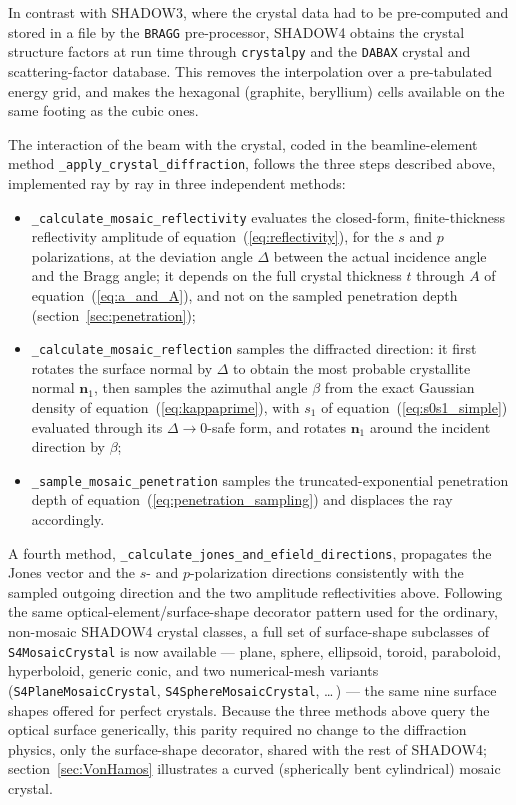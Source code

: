 \documentclass{iucr}
\begin{document}
In contrast with SHADOW3, where the crystal data had to be pre-computed and stored
in a file by the \texttt{BRAGG} pre-processor, SHADOW4 obtains the crystal
structure factors at run time through \texttt{crystalpy} and the \texttt{DABAX}
crystal and scattering-factor database. This removes the interpolation over a
pre-tabulated energy grid, and makes the hexagonal (graphite, beryllium) cells
available on the same footing as the cubic ones.

The interaction of the beam with the crystal, coded in the beamline-element
method \texttt{\_apply\_crystal\_diffraction}, follows the three steps described
above, implemented ray by ray in three independent methods:
\begin{itemize}
\item \texttt{\_calculate\_mosaic\_reflectivity} evaluates the closed-form,
finite-thickness reflectivity amplitude of equation~(\ref{eq:reflectivity}), for
the $s$ and $p$ polarizations, at the deviation angle $\Delta$ between the actual
incidence angle and the Bragg angle; it depends on the full crystal thickness $t$
through $A$ of equation~(\ref{eq:a_and_A}), and not on the sampled penetration
depth (section~\ref{sec:penetration});
\item \texttt{\_calculate\_mosaic\_reflection} samples the diffracted direction: it
first rotates the surface normal by $\Delta$ to obtain the most probable
crystallite normal $\mathbf{n}_1$, then samples the azimuthal angle $\beta$ from
the exact Gaussian density of equation~(\ref{eq:kappaprime}), with $s_1$ of
equation~(\ref{eq:s0s1_simple}) evaluated through its $\Delta \rightarrow 0$-safe
form, and rotates $\mathbf{n}_1$ around the incident direction by $\beta$;
\item \texttt{\_sample\_mosaic\_penetration} samples the truncated-exponential
penetration depth of equation~(\ref{eq:penetration_sampling}) and displaces the
ray accordingly.
\end{itemize}
A fourth method, \texttt{\_calculate\_jones\_and\_efield\_directions}, propagates
the Jones vector and the $s$- and $p$-polarization directions consistently with
the sampled outgoing direction and the two amplitude reflectivities above.
Following the same optical-element/surface-shape decorator pattern used for the
ordinary, non-mosaic SHADOW4 crystal classes, a full set of surface-shape
subclasses of \texttt{S4MosaicCrystal} is now available --- plane, sphere,
ellipsoid, toroid, paraboloid, hyperboloid, generic conic, and two
numerical-mesh variants (\texttt{S4PlaneMosaicCrystal}, \texttt{S4SphereMosaicCrystal},
\ldots\,) --- the same nine surface shapes offered for perfect crystals. Because
the three methods above query the optical surface generically, this parity
required no change to the diffraction physics, only the surface-shape decorator,
shared with the rest of SHADOW4; section~\ref{sec:VonHamos} illustrates a curved
(spherically bent cylindrical) mosaic crystal.
\end{document}
